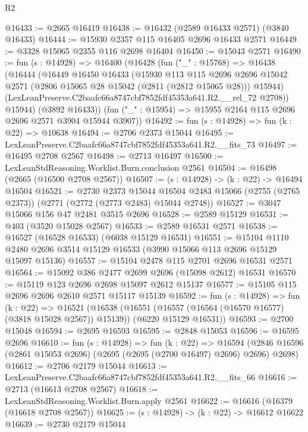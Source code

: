 \begin{lexlean}{R2}
\begin{coremodule}
@16433 := @2665 @16419
@16438 := @16432 (@2589 @16433 @2571) (@3840 @16433)
@16444 := @15930 @2357 @115 @16405 @2696 @16433 @2571
@16449 := @3328 @15065 @2355 @116 @2698 @16404
@16450 := @15043 @2571
@16490 := fun (s : @14928) =>
  @16400
    (@16428
      (fun ("_" : @15768) =>
      @16438
        (@16444
          (@16449
            @16450
            @16433
            (@15930
              @113
              @115
              @2696
              @2696
              @15042
              @2571
              (@2806 @15065 @28 @15042 (@2811 (@2812 @15065 @28)))
              @15944)
            (LexLeanPreserve.C2baafc66a8747cbf7852fdf45353a641.R2.__rel_72 @2708))
          @15944)
        (@3892 @16433))
      (fun ("_" : @15954) => @15955 @2164 @115 @2696 @2696 @2571 @3904 @15944 @3907))
@16492 := fun (s : @14928) => fun (k : @22) => @10638
@16494 := @2706 @2373 @15044
@16495 := LexLeanPreserve.C2baafc66a8747cbf7852fdf45353a641.R2.__fits_73
@16497 := @16495 @2708 @2567
@16498 := @2713 @16497
@16500 := LexLeanStdReasoning.Worklist.Burn.conclusion @2561
@16504 := @16498 (@2665 (@16500 @2708 @2567))
@16507 := (s : @14928) -> (k : @22) -> @16494 @16504
@16521 := @2730
    @2373
    @15044
    @16504
    @2483
    @15066
    (@2755 (@2765 @2373))
    (@2771 (@2772 (@2773 @2483) @15044 @2748))
@16527 := @3047 @15066 @156 @47 @2481 @3515 @2696
@16528 := @2589 @15129
@16531 := @403 (@3520 @15028 @2567)
@16533 := @2589 @16531 @2571
@16538 := @16527 (@16528 @16533) (@6038 @15129 @16531)
@16551 := @15104
    @1110
    @2480
    @2696
    @3514
    @15129
    @16533
    (@3990 @15066 @113 @2696 @15129 @15097 @15136)
@16557 := @15104 @2478 @115 @2701 @2696 @16531 @2571
@16564 := @15092 @386 @2477 @2699 @2696 (@15098 @2612) @16531
@16570 := @15119 @123 @2696 @2698 @15097 @2612 @15137
@16577 := @15105 @115 @2696 @2696 @2610 @2571 @15117 @15139
@16592 := fun (s : @14928) =>
  fun (k : @22) =>
  @16521
    (@16538
      (@16551 (@16557 (@16564 (@16570 @16577) (@3818 @15028 @2567)) @15139))
      (@6220 @15129 @16531))
@16593 := @2700 @15048
@16594 := @2695 @16593
@16595 := @2848 @15053
@16596 := @16595 @2696
@16610 := fun (s : @14928) =>
  fun (k : @22) =>
  @16594 (@2846 @16596 (@2861 @15053 @2696) (@2695 (@2695 (@2700 @16497) @2696) @2696) @2698)
@16612 := @2706 @2179 @15044
@16613 := LexLeanPreserve.C2baafc66a8747cbf7852fdf45353a641.R2.__fits_66
@16616 := @2713 (@16613 @2708 @2567)
@16618 := LexLeanStdReasoning.Worklist.Burn.apply @2561
@16622 := @16616 (@16379 (@16618 @2708 @2567))
@16625 := (s : @14928) -> (k : @22) -> @16612 @16622
@16639 := @2730
    @2179
    @15044

\end{coremodule}
\end{lexlean}
